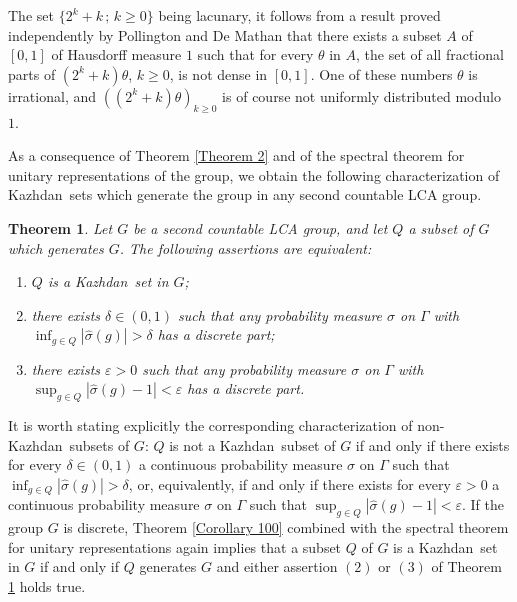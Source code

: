 \documentclass[11pt,english,a4paper]{smfart}
\numberwithin{equation}{section}
\newtheorem{theorem}{Theorem}[section]
\theoremstyle{definition}
\begin{document}
\begin{remark}\label{rem+}
The set $\{2^{k}+k\,;\, k\ge 0\}$ being lacunary, it follows from a result proved independently 
by Pollington \cite{Pol} and De Mathan \cite{DM} that there exists a subset $A$ of $[0,1]$ of Hausdorff measure $1$ such that for every $\theta $ in $ A$, the set
of all fractional parts of $(2^{k}+k)\theta $, $k\ge 0$, is not dense in $[0,1]$. One of these numbers $\theta $ is irrational, and $((2^{k}+k)\theta )_{k\ge 0}$ is of course not uniformly distributed modulo $1$. 
\end{remark}

As a consequence of
Theorem \ref{Theorem 2} and of the spectral theorem for unitary representations of the group, we obtain the following characterization of {Kazhdan}\ sets which generate the group
in any second countable LCA group. 

\begin{theorem}\label{nimporte}
 Let $G$ be a second countable LCA group, and let ${Q}$ a subset of $G$ which generates $G$. The following assertions are equivalent:
 \begin{enumerate}
 \item [(1)] ${Q}$ is a {Kazhdan}\ set in $G$;
\item[(2)] there exists $\delta\in (0,1)$ such that any probability measure $\sigma $ on $\Gamma $ with $\inf_{g\in{Q}}|\widehat{\sigma }(g)|>\delta$
has a discrete part;
\item[(3)] there exists $\varepsilon >0$ such that any probability measure $\sigma $ on $\Gamma $ with $\sup_{g\in{Q}}|\widehat{\sigma }(g)-1|<\varepsilon$
has a discrete part.
\end{enumerate}
\end{theorem}

It is worth stating explicitly the corresponding 
characterization of non-{Kazhdan}\ subsets of $G$: ${Q}$ is not a {Kazhdan}\ subset of $G$ if and only if
there exists for every $\delta\in (0,1)$  a continuous probability measure $\sigma $ on $\Gamma $ such that $\inf_{g\in{Q}}|\widehat{\sigma }(g)|>\delta$, or, equivalently, if and only
if there exists for every $\varepsilon >0$ a continuous probability measure $\sigma $ on $\Gamma $ such that $\sup_{g\in{Q}}|\widehat{\sigma }(g)-1|<\varepsilon$. If the group $G$ is discrete, Theorem \ref{Corollary 100} combined with the spectral theorem for unitary representations again 
implies that a subset ${Q}$ of $G$ is a {Kazhdan}\ set in $G$ if and only if ${Q}$ generates $G$ and either assertion $(2)$ or $(3)$ of Theorem \ref{nimporte} holds true.
\end{document}
